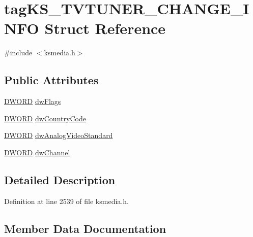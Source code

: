 \hypertarget{structtag_k_s___t_v_t_u_n_e_r___c_h_a_n_g_e___i_n_f_o}{}\section{tag\+K\+S\+\_\+\+T\+V\+T\+U\+N\+E\+R\+\_\+\+C\+H\+A\+N\+G\+E\+\_\+\+I\+N\+FO Struct Reference}
\label{structtag_k_s___t_v_t_u_n_e_r___c_h_a_n_g_e___i_n_f_o}


{\ttfamily \#include $<$ksmedia.\+h$>$}

\subsection*{Public Attributes}
\begin{DoxyCompactItemize}
\item 
\hyperlink{mapinls_8h_ad342ac907eb044443153a22f964bf0af}{D\+W\+O\+RD} \hyperlink{structtag_k_s___t_v_t_u_n_e_r___c_h_a_n_g_e___i_n_f_o_ac4a60d39fb1809d143d7f30021c4ee67}{dw\+Flags}
\item 
\hyperlink{mapinls_8h_ad342ac907eb044443153a22f964bf0af}{D\+W\+O\+RD} \hyperlink{structtag_k_s___t_v_t_u_n_e_r___c_h_a_n_g_e___i_n_f_o_a3658f9c947c17aa87da9e4869a5f2b8e}{dw\+Country\+Code}
\item 
\hyperlink{mapinls_8h_ad342ac907eb044443153a22f964bf0af}{D\+W\+O\+RD} \hyperlink{structtag_k_s___t_v_t_u_n_e_r___c_h_a_n_g_e___i_n_f_o_abb514f964e558a85d1052e0fa32437ee}{dw\+Analog\+Video\+Standard}
\item 
\hyperlink{mapinls_8h_ad342ac907eb044443153a22f964bf0af}{D\+W\+O\+RD} \hyperlink{structtag_k_s___t_v_t_u_n_e_r___c_h_a_n_g_e___i_n_f_o_af9bd59103584bea062bba41d19709817}{dw\+Channel}
\end{DoxyCompactItemize}


\subsection{Detailed Description}


Definition at line 2539 of file ksmedia.\+h.



\subsection{Member Data Documentation}
